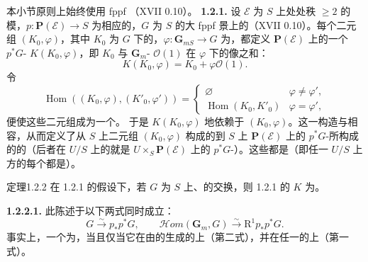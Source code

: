 本小节原则上始终使用 fppf （XVII 0.10）。
\textbf{1.2.1.} 设 $\mathscr E$ 为 $S$ 上处处秩 $\geq2$ 的模，$p:\mathbf P(\mathscr E)\to S$ 为相应的，$G$ 为 $S$ 的大 fppf 景上的（XVII 0.10）。每个二元组 $(K_0,\varphi)$，其中 $K_0$ 为 $G$ 下的，$\varphi:\mathbf G_{mS}\to G$ 为，都定义 $\mathbf P(\mathscr E)$ 上的一个 $p^*G$- $K(K_0,\varphi)$，即 $K_0$ 与 $\mathbf G_m$- $\mathscr O(1)$ 在 $\varphi$ 下的像之和：
\begin{equation}K(K_0,\varphi)=K_0+\varphi\mathscr O(1).\tag{1.2.1.1}\end{equation}
令
\[\operatorname{Hom}((K_0,\varphi),(K'_0,\varphi'))=\begin{cases}\varnothing&\varphi\ne\varphi',\\\operatorname{Hom}(K_0,K'_0)&\varphi=\varphi',\end{cases}\]
便使这些二元组成为一个。
于是 $K(K_0,\varphi)$ 地依赖于 $(K_0,\varphi)$。这一构造与相容，从而定义了从 $S$ 上二元组 $(K_0,\varphi)$ 构成的到 $S$ 上 $\mathbf P(\mathscr E)$ 上的 $p^*G$-所构成的的（后者在 $U/S$ 上的就是 $U\times_S\mathbf P(\mathscr E)$ 上的 $p^*G$-）。这些都是（即任一 $U/S$ 上方的每个都是）。
\begin{SGAresult}{定理}{1.2.2}
在 1.2.1 的假设下，若 $G$ 为 $S$ 上、的交换，则 1.2.1 的 $K$ 为。
\end{SGAresult}
\textbf{1.2.2.1.} 此陈述于以下两式同时成立：
\[G\xrightarrow\sim p_*p^*G,\qquad\mathscr Hom(\mathbf G_m,G)\xrightarrow\sim\mathrm R^1p_*p^*G.\]
事实上，一个为，当且仅当它在由的生成的上（第二式），并在任一的上（第一式）。
